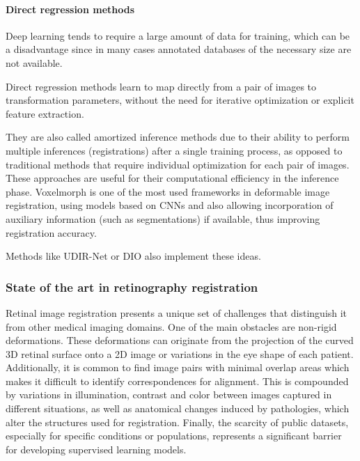 \paragraph{Direct regression methods}
\label{par:direct_regression}

Deep learning tends to require a large amount of data for training, which can be a disadvantage since in many cases annotated databases of the necessary size are not available.

Direct regression methods learn to map directly from a pair of images to transformation parameters, without the need for iterative optimization or explicit feature extraction.

They are also called amortized inference methods due to their ability to perform multiple inferences (registrations) after a single training process, as opposed to traditional methods that require individual optimization for each pair of images.
These approaches are useful for their computational efficiency in the inference phase. Voxelmorph \cite{Balakrishnan_2019voxelmorph} is one of the most used frameworks in deformable image registration, using models based on \gls{CNN}s and also allowing incorporation of auxiliary information (such as segmentations) if available, thus improving registration accuracy.

Methods like UDIR-Net \cite{undefreg} or DIO \cite{Jena_2025} also implement these ideas.

\subsubsection{State of the art in retinography registration}\label{subsubsec:Estado_da_arte_no_rexistro_de_retinografías}

Retinal image registration presents a unique set of challenges that distinguish it from other medical imaging domains.
One of the main obstacles are non-rigid deformations. These deformations can originate from the projection of the curved 3D retinal surface onto a 2D image or variations in the eye shape of each patient. Additionally, it is common to find image pairs with minimal overlap areas which makes it difficult to identify correspondences for alignment. This is compounded by variations in illumination, contrast and color between images captured in different situations, as well as anatomical changes induced by pathologies, which alter the structures used for registration.
Finally, the scarcity of public datasets, especially for specific conditions or populations, represents a significant barrier for developing supervised learning models.

